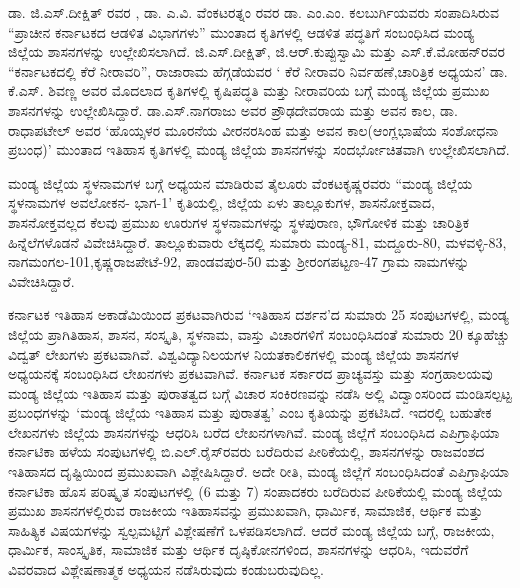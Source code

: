 ಡಾ. ಜಿ.ಎಸ್​.ದೀಕ್ಷಿತ್​ ರವರ , ಡಾ. ಎ.ವಿ. ವೆಂಕಟರತ್ನಂ ರವರ  ಡಾ. ಎಂ.ಎಂ. ಕಲಬುರ್ಗಿಯವರು ಸಂಪಾದಿಸಿರುವ “ಪ್ರಾಚೀನ ಕರ್ನಾಟಕದ ಆಡಳಿತ ವಿಭಾಗಗಳು” ಮುಂತಾದ ಕೃತಿಗಳಲ್ಲಿ ಆಡಳಿತ ಪದ್ಧತಿಗೆ ಸಂಬಂಧಿಸಿದ ಮಂಡ್ಯ ಜಿಲ್ಲೆಯ ಶಾಸನಗಳನ್ನು ಉಲ್ಲೇಖಿಸಲಾಗಿದೆ. ಜಿ.ಎಸ್​.ದೀಕ್ಷಿತ್​, ಜಿ.ಆರ್​.ಕುಪ್ಪುಸ್ವಾಮಿ ಮತ್ತು ಎಸ್​.ಕೆ.ಮೋಹನ್​ರವರ “ಕರ್ನಾಟಕದಲ್ಲಿ ಕೆರೆ ನೀರಾವರಿ”, ರಾಜಾರಾಮ ಹೆಗ್ಗಡೆಯವರ ‘ ಕೆರೆ ನೀರಾವರಿ ನಿರ್ವಹಣೆ,ಚಾರಿತ್ರಿಕ ಅಧ್ಯಯನ’ ಡಾ. ಕೆ.ಎಸ್​. ಶಿವಣ್ಣ ಅವರ  ಮೊದಲಾದ ಕೃತಿಗಳಲ್ಲಿ ಕೃಷಿಪದ್ಧತಿ ಮತ್ತು ನೀರಾವರಿಯ ಬಗ್ಗೆ ಮಂಡ್ಯ ಜಿಲ್ಲೆಯ ಪ್ರಮುಖ ಶಾಸನಗಳನ್ನು ಉಲ್ಲೇಖಿಸಿದ್ದಾರೆ. ಡಾ.ಎಸ್​.ನಾಗರಾಜು ಅವರ ಪ್ರೌಢದೇವರಾಯ ಮತ್ತು ಅವನ ಕಾಲ, ಡಾ. ರಾಧಾಪಟೇಲ್​ ಅವರ ‘ಹೊಯ್ಸಳರ ಮೂರನೆಯ ವೀರನರಸಿಂಹ ಮತ್ತು ಅವನ ಕಾಲ(ಆಂಗ್ಲಭಾಷೆಯ ಸಂಶೋಧನಾ ಪ್ರಬಂಧ)’ ಮುಂತಾದ ಇತಿಹಾಸ ಕೃತಿಗಳಲ್ಲಿ ಮಂಡ್ಯ ಜಿಲ್ಲೆಯ ಶಾಸನಗಳನ್ನು ಸಂದರ್ಭೋಚಿತವಾಗಿ ಉಲ್ಲೇಖಿಸಲಾಗಿದೆ.

ಮಂಡ್ಯ ಜಿಲ್ಲೆಯ ಸ್ಥಳನಾಮಗಳ ಬಗ್ಗೆ ಅಧ್ಯಯನ ಮಾಡಿರುವ ತೈಲೂರು ವೆಂಕಟಕೃಷ್ಣರವರು “ಮಂಡ್ಯ ಜಿಲ್ಲೆಯ ಸ್ಥಳನಾಮಗಳ ಅವಲೋಕನ- ಭಾಗ-1’ ಕೃತಿಯಲ್ಲಿ, ಜಿಲ್ಲೆಯ ಏಳು ತಾಲ್ಲೂಕುಗಳ, ಶಾಸನೋಕ್ತವಾದ, ಶಾಸನೋಕ್ತವಲ್ಲದ ಕೆಲವು ಪ್ರಮುಖ ಊರುಗಳ ಸ್ಥಳನಾಮಗಳನ್ನು ಸ್ಥಳಪುರಾಣ, ಭೌಗೋಳಿಕ ಮತ್ತು ಚಾರಿತ್ರಿಕ ಹಿನ್ನೆಲೆಗಳೊಡನೆ ವಿವೇಚಿಸಿದ್ದಾರೆ. ತಾಲ್ಲೂಕುವಾರು ಲೆಕ್ಕದಲ್ಲಿ ಸುಮಾರು ಮಂಡ್ಯ-81, ಮದ್ದೂರು-80, ಮಳವಳ್ಳಿ-83, ನಾಗಮಂಗಲ-101,\break ಕೃಷ್ಣರಾಜಪೇಟೆ-92, ಪಾಂಡವಪುರ-50 ಮತ್ತು ಶ‍್ರೀರಂಗಪಟ್ಟಣ-47 ಗ್ರಾಮ ನಾಮಗಳನ್ನು ವಿವೇಚಿಸಿದ್ದಾರೆ.

ಕರ್ನಾಟಕ ಇತಿಹಾಸ ಅಕಾಡೆಮಿಯಿಂದ ಪ್ರಕಟವಾಗಿರುವ ‘ಇತಿಹಾಸ ದರ್ಶನ’ದ ಸುಮಾರು 25 ಸಂಪುಟಗಳಲ್ಲಿ, ಮಂಡ್ಯ ಜಿಲ್ಲೆಯ ಪ್ರಾಗಿತಿಹಾಸ, ಶಾಸನ, ಸಂಸ್ಕೃತಿ, ಸ್ಥಳನಾಮ, ವಾಸ್ತು ವಿಚಾರಗಳಿಗೆ ಸಂಬಂಧಿಸಿದಂತೆ ಸುಮಾರು 20 ಕ್ಕೂ\break ಹೆಚ್ಚು ವಿದ್ವತ್​ ಲೇಖಗಳು ಪ್ರಕಟವಾಗಿವೆ. ವಿಶ್ವವಿದ್ಯಾನಿಲಯಗಳ ನಿಯತಕಾಲಿಕಗಳಲ್ಲಿ ಮಂಡ್ಯ ಜಿಲ್ಲೆಯ ಶಾಸನಗಳ ಅಧ್ಯಯನಕ್ಕೆ ಸಂಬಂಧಿಸಿದ ಲೇಖನಗಳು ಪ್ರಕಟವಾಗಿವೆ. ಕರ್ನಾಟಕ ಸರ್ಕಾರದ ಪ್ರಾಚ್ಯವಸ್ತು ಮತ್ತು ಸಂಗ್ರಹಾಲಯವು ಮಂಡ್ಯ ಜಿಲ್ಲೆಯ ಇತಿಹಾಸ ಮತ್ತು ಪುರಾತತ್ವದ ಬಗ್ಗೆ ವಿಚಾರ ಸಂಕಿರಣವನ್ನು ನಡೆಸಿ ಅಲ್ಲಿ ವಿದ್ವಾಂಸರಿಂದ ಮಂಡಿಸಲ್ಪಟ್ಟ ಪ್ರಬಂಧಗಳನ್ನು ‘ಮಂಡ್ಯ ಜಿಲ್ಲೆಯ ಇತಿಹಾಸ ಮತ್ತು ಪುರಾತತ್ವ’ ಎಂಬ ಕೃತಿಯನ್ನು ಪ್ರಕಟಿಸಿದೆ. ಇದರಲ್ಲಿ ಬಹುತೇಕ ಲೇಖನಗಳು ಜಿಲ್ಲೆಯ ಶಾಸನಗಳನ್ನು ಆಧರಿಸಿ ಬರೆದ ಲೇಖನಗಳಾಗಿವೆ. ಮಂಡ್ಯ ಜಿಲ್ಲೆಗೆ ಸಂಬಂಧಿಸಿದ ಎಪಿಗ್ರಾಫಿಯಾ ಕರ್ನಾಟಿಕಾ ಹಳೆಯ ಸಂಪುಟಗಳಲ್ಲಿ ಬಿ.ಎಲ್​.ರೈಸ್​ರವರು ಬರೆದಿರುವ ಪೀಠಿಕೆಯಲ್ಲಿ, ಶಾಸನಗಳನ್ನು ರಾಜವಂಶದ ಇತಿಹಾಸದ ದೃಷ್ಟಿಯಿಂದ ಪ್ರಮುಖವಾಗಿ ವಿಶ್ಲೇಷಿಸಿದ್ದಾರೆ. ಅದೇ ರೀತಿ, ಮಂಡ್ಯ ಜಿಲ್ಲೆಗೆ ಸಂಬಂಧಿಸಿದಂತೆ ಎಪಿಗ್ರಾಫಿಯಾ ಕರ್ನಾಟಿಕಾ ಹೊಸ ಪರಿಷ್ಕೃತ ಸಂಪುಟಗಳಲ್ಲಿ (6 ಮತ್ತು 7) ಸಂಪಾದಕರು ಬರೆದಿರುವ ಪೀಠಿಕೆಯಲ್ಲಿ ಮಂಡ್ಯ ಜಿಲ್ಲೆಯ ಪ್ರಮುಖ ಶಾಸನಗಳಲ್ಲಿರುವ ರಾಜಕೀಯ ಇತಿಹಾಸವನ್ನು ಪ್ರಮುಖವಾಗಿ, ಧಾರ್ಮಿಕ, ಸಾಮಾಜಿಕ, ಆರ್ಥಿಕ ಮತ್ತು ಸಾಹಿತ್ಯಿಕ ವಿಷಯಗಳನ್ನು ಸ್ವಲ್ಪಮಟ್ಟಿಗೆ ವಿಶ್ಲೇಷಣೆಗೆ ಒಳಪಡಿಸಲಾಗಿದೆ. ಆದರೆ ಮಂಡ್ಯ ಜಿಲ್ಲೆಯ ಬಗ್ಗೆ, ರಾಜಕೀಯ, ಧಾರ್ಮಿಕ, ಸಾಂಸ್ಕೃತಿಕ, ಸಾಮಾಜಿಕ ಮತ್ತು ಆರ್ಥಿಕ ದೃಷ್ಠಿಕೋನಗಳಿಂದ, ಶಾಸನಗಳನ್ನು ಆಧರಿಸಿ, ಇದುವರೆಗೆ ವಿವರವಾದ ವಿಶ್ಲೇಷಣಾತ್ಮಕ ಅಧ್ಯಯನ ನಡೆಸಿರುವುದು ಕಂಡುಬರುವುದಿಲ್ಲ.

